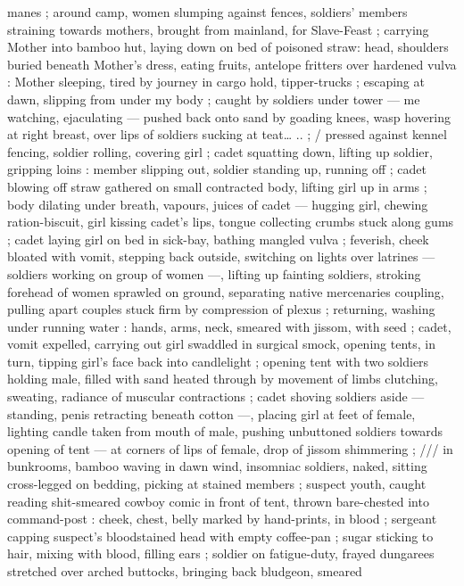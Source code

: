 \documentclass[10pt,twoside]{memoir}
\begin{document}
manes ; around camp, women slumping against fences, soldiers' 
members straining towards mothers, brought from mainland, for 
Slave-Feast ; carrying Mother into bamboo hut, laying down on bed 
of poisoned straw: head, shoulders buried beneath Mother's dress, 
eating fruits, antelope fritters over hardened vulva : Mother sleeping, 
tired by journey in cargo hold, tipper-trucks ; escaping at dawn, 
slipping from under my body ; caught by soldiers under tower --- me 
watching, ejaculating --- pushed back onto sand by goading knees, 
wasp hovering at right breast, over lips of soldiers sucking at teat{\ldots} 
{\guillemotright}.. ; / pressed against kennel fencing, soldier rolling, covering girl ; 
cadet squatting down, lifting up soldier, gripping loins : member 
slipping out, soldier standing up, running off ; cadet blowing off 
straw gathered on small contracted body, lifting girl up in arms ; body
dilating under breath, vapours, juices of cadet --- hugging girl, 
chewing ration-biscuit, girl kissing cadet's lips, tongue collecting 
crumbs stuck along gums ; cadet laying girl on bed in sick-bay, 
bathing mangled vulva ; feverish, cheek bloated with vomit, stepping 
back outside, switching on lights over latrines --- soldiers working on 
group of women ---, lifting up fainting soldiers, stroking forehead of 
women sprawled on ground, separating native mercenaries coupling, 
pulling apart couples stuck firm by compression of plexus ; 
returning, washing under running water : hands, arms, neck, 
smeared with jissom, with seed ; cadet, vomit expelled, carrying out 
girl swaddled in surgical smock, opening tents, in turn, tipping girl's 
face back into candlelight ; opening tent with two soldiers holding 
male, filled with sand heated through by movement of limbs 
clutching, sweating, radiance of muscular contractions ; cadet 
shoving soldiers aside --- standing, penis retracting beneath cotton 
---, placing girl at feet of female, lighting candle taken from mouth 
of male, pushing unbuttoned soldiers towards opening of tent --- at 
corners of lips of female, drop of jissom shimmering ; /// in bunkrooms, 
bamboo waving in dawn wind, insomniac soldiers, naked, 
sitting cross-legged on bedding, picking at stained members ; 
suspect youth, caught reading shit-smeared cowboy comic in front of 
tent, thrown bare-chested into command-post : cheek, chest, belly 
marked by hand-prints, in blood ; sergeant capping suspect's bloodstained 
head with empty coffee-pan ; sugar sticking to hair, mixing 
with blood, filling ears ; soldier on fatigue-duty, frayed dungarees 
stretched over arched buttocks, bringing back bludgeon, smeared 
\end{document}
